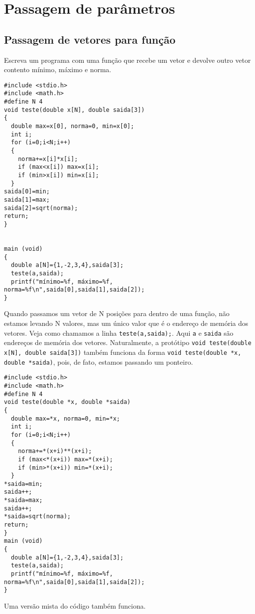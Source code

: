 \chapter{Passagem de parâmetros}

\section{Passagem de vetores para função}
\begin{ex}
Escreva um programa com uma função que recebe um vetor e devolve outro vetor contento mínimo, máximo e norma.
\end{ex}
\begin{verbatim}
#include <stdio.h>
#include <math.h>
#define N 4
void teste(double x[N], double saida[3])
{
  double max=x[0], norma=0, min=x[0];
  int i;
  for (i=0;i<N;i++) 
  {
    norma+=x[i]*x[i];
    if (max<x[i]) max=x[i];
    if (min>x[i]) min=x[i];
  }
saida[0]=min;
saida[1]=max;
saida[2]=sqrt(norma);
return;
}


main (void)
{
  double a[N]={1,-2,3,4},saida[3];
  teste(a,saida);
  printf("mínimo=%f, máximo=%f, norma=%f\n",saida[0],saida[1],saida[2]);  
}
\end{verbatim}
Quando passamos um vetor de N posições para dentro de uma função, não estamos levando N valores, mas um único valor que é o endereço de memória dos vetores. Veja como chamamos a linha \verb|teste(a,saida);|. Aqui \verb|a| e \verb|saida| são endereços de memória dos vetores. Naturalmente, a protótipo \verb|void teste(double x[N], double saida[3])| também funciona da forma \verb|void teste(double *x, double *saida)|, pois, de fato, estamos passando um ponteiro.
\begin{verbatim}
#include <stdio.h>
#include <math.h>
#define N 4
void teste(double *x, double *saida)
{
  double max=*x, norma=0, min=*x;
  int i;
  for (i=0;i<N;i++) 
  {
    norma+=*(x+i)**(x+i);
    if (max<*(x+i)) max=*(x+i);
    if (min>*(x+i)) min=*(x+i);
  }
*saida=min;
saida++;
*saida=max;
saida++;
*saida=sqrt(norma);
return;
}
main (void)
{
  double a[N]={1,-2,3,4},saida[3];
  teste(a,saida);
  printf("mínimo=%f, máximo=%f, norma=%f\n",saida[0],saida[1],saida[2]);  
}
\end{verbatim}
Uma versão mista do código também funciona.

